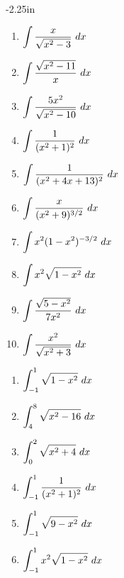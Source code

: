 \begin{adjustwidth*}{}{-2.25in}
\begin{multicols*}{2}

\begin{enumerate}[1),resume]
\item $\ds \int \frac x{\sqrt{x^2-3}}\ dx$
\item $\ds \int \frac {\sqrt{x^2-11}}x\ dx$
\item $\ds \int \frac {5x^2}{\sqrt{x^2-10}}\ dx$
\item $\ds \int \frac {1}{(x^2+1)^2}\ dx$
\item $\ds \int \frac {1}{(x^2+4x+13)^2}\ dx$
\item $\ds \int \frac {x}{(x^2+9)^{3/2}}\ dx$
\item $\ds \int x^2(1-x^2)^{-3/2}\ dx$
\item $\ds \int x^2\sqrt{1-x^2}\ dx$
\item $\ds \int \frac{\sqrt{5-x^2}}{7x^2}\ dx$
\item $\ds \int \frac{x^2}{\sqrt{x^2+3}}\ dx$
\end{enumerate}


\begin{enumerate}[1),resume]
\item $\ds \int_{-1}^1 \sqrt{1-x^2}\ dx$
\item $\ds \int_{4}^8 \sqrt{x^2-16}\ dx$
\item $\ds \int_{0}^2 \sqrt{x^2+4}\ dx$
\item $\ds \int_{-1}^1 \frac1{(x^2+1)^2}\ dx$
\item $\ds \int_{-1}^1 \sqrt{9-x^2}\ dx$
\item $\ds \int_{-1}^1 x^2\sqrt{1-x^2}\ dx$
\end{enumerate}

\end{multicols*}
\end{adjustwidth*}

%
%
%

\afterexercises